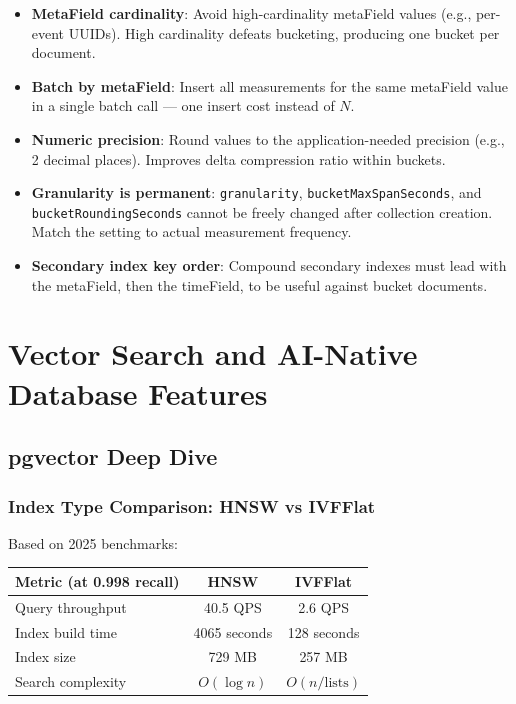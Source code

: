 \documentclass[12pt,a4paper]{article}
\begin{document}
\begin{infobox}
\begin{itemize}
    \item \textbf{MetaField cardinality}: Avoid high-cardinality metaField values (e.g., per-event UUIDs). High cardinality defeats bucketing, producing one bucket per document.
    \item \textbf{Batch by metaField}: Insert all measurements for the same metaField value in a single batch call --- one insert cost instead of $N$.
    \item \textbf{Numeric precision}: Round values to the application-needed precision (e.g., 2 decimal places). Improves delta compression ratio within buckets.
    \item \textbf{Granularity is permanent}: \texttt{granularity}, \texttt{bucketMaxSpanSeconds}, and \texttt{bucketRoundingSeconds} cannot be freely changed after collection creation. Match the setting to actual measurement frequency.
    \item \textbf{Secondary index key order}: Compound secondary indexes must lead with the metaField, then the timeField, to be useful against bucket documents.
\end{itemize}
\end{infobox}


\section{Vector Search and AI-Native Database Features}

\subsection{pgvector Deep Dive}

\subsubsection{Index Type Comparison: HNSW vs IVFFlat}

Based on 2025 benchmarks:

\begin{center}
\begin{tabular}{lcc}
\toprule
\textbf{Metric (at 0.998 recall)} & \textbf{HNSW} & \textbf{IVFFlat} \\
\midrule
Query throughput & 40.5 QPS & 2.6 QPS \\
Index build time & 4065 seconds & 128 seconds \\
Index size & 729 MB & 257 MB \\
Search complexity & $O(\log n)$ & $O(n/\text{lists})$ \\
\bottomrule
\end{tabular}
\end{center}
\end{document}
